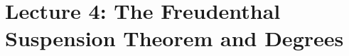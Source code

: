 \documentclass[10pt,oneside,leqno,openright]{memoir}
\begin{document}

\chapter*[Freudenthal and Degrees]{Lecture 4: The Freudenthal Suspension Theorem and Degrees}
\label{ch:pushouts}
\end{document}
